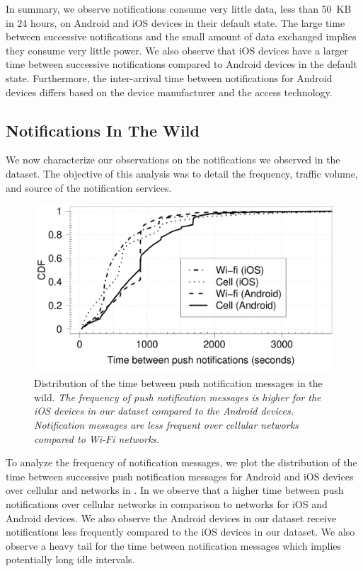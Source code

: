 In summary, we observe notifications consume very little data, less than 50~KB in 24 hours, on Android and iOS devices in their default state.
The large time between successive notifications and the small amount of data exchanged implies they consume very little power.
We also observe that iOS devices have a larger time between successive notifications compared to Android devices in the default state. 
Furthermore, the inter-arrival time between notifications for Android devices differs based on the device manufacturer and the access technology. 

\subsection{Notifications In The Wild} 

We now characterize our observations on the notifications we observed in the \mobWild dataset. 
The objective of this analysis was to detail the frequency, traffic volume, and source of the notification services. 

\begin{figure}
\centering
\includegraphics[width=\columnwidth]{plots/push_compare_os_tech_wild_distrib.pdf}
\caption{Distribution of the time between push notification messages in the wild. \emph{The frequency of push notification messages is higher for the iOS devices in our dataset compared to the Android devices. Notification messages are less frequent over cellular networks compared to Wi-Fi networks.}}
\label{fig:push-wild-compare-ostech}
\end{figure}

To analyze the frequency of notification messages, we plot the distribution of the time between successive push notification messages for Android and iOS devices over cellular and \wifi networks in .
In  we observe that a higher time between push notifications over cellular networks in comparison to \wifi networks for iOS and Android devices.  
We also observe the Android devices in our dataset receive notifications less frequently compared to the iOS devices in our dataset. 
We also observe a heavy tail for the time between notification messages which implies potentially long idle intervals.


